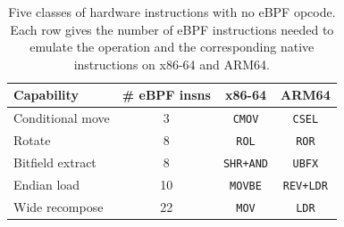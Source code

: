 \begin{table}[t]
\centering
\small
\caption{Five classes of hardware instructions with no eBPF opcode. Each row gives the number of eBPF instructions needed to emulate the operation and the corresponding native instructions on x86-64 and ARM64.}
\label{tab:isa-gap}
\begin{tabular}{@{}lccc@{}}
\toprule
Capability & \# eBPF insns & x86-64 & ARM64 \\
\midrule
Conditional move & 3 & \texttt{CMOV} & \texttt{CSEL} \\
Rotate & 8 & \texttt{ROL} & \texttt{ROR} \\
Bitfield extract & 8 & \texttt{SHR+AND} & \texttt{UBFX} \\
Endian load & 10 & \texttt{MOVBE} & \texttt{REV+LDR} \\
Wide recompose & 22 & \texttt{MOV} & \texttt{LDR} \\
\bottomrule
\end{tabular}
\end{table}